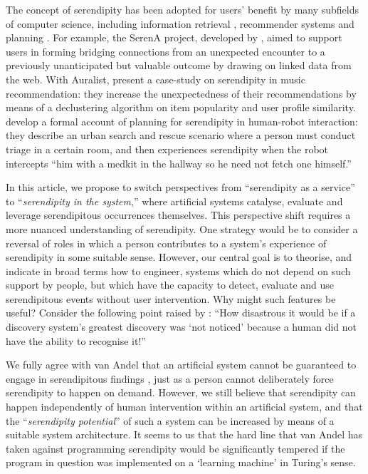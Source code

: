 The concept of serendipity has been adopted for users' benefit by many subfields of computer science, including information retrieval \cite{Toms2000, Andre:2009:XSP:1518701.1519009}, recommender systems \cite{kotkov2016survey} and planning \cite{muscettola1997board, chakraborti2015planning}. For example, the {\sf SerenA} project, developed by \citet{maxwell2012designing}, aimed to support users in forming bridging connections from an unexpected encounter to a previously unanticipated but valuable outcome by drawing on linked data from the web. With {\sf Auralist}, \citet{Zhang2011} present a case-study on serendipity in music recommendation: they increase the unexpectedness of their recommendations by means of a declustering algorithm on item popularity and user profile similarity. \citet{chakraborti2015planning} develop a formal account of planning for serendipity in human-robot interaction: they describe an urban search and rescue scenario where a person must conduct triage in a certain room, and then experiences serendipity when the robot intercepts ``him with a medkit in the hallway so he need not fetch one himself.''

In this article, we propose to switch perspectives from ``serendipity as a service'' to ``\emph{serendipity in the system},'' where artificial systems catalyse, evaluate and leverage serendipitous occurrences themselves. This perspective shift requires a more nuanced understanding of serendipity.  One strategy would be to consider a reversal of roles in which a person contributes to a system's experience of serendipity in some suitable sense.  However, our central goal is to theorise, and indicate in broad terms how to engineer, systems which do not depend on such support by people, but which have the capacity to detect, evaluate and use serendipitous events without user intervention.  Why might such features be useful?  Consider the following point raised by \citet{delamaza1994generate}: ``How disastrous it would be if a discovery system's greatest discovery was `not noticed' because a human did not have the ability to recognise it!''

We fully agree with van Andel that an artificial system cannot be guaranteed to engage in serendipitous findings \cite{van1994anatomy}, just as a person cannot deliberately force serendipity to happen on demand.  However, we still believe that serendipity can happen independently of human intervention within an artificial system, and that the ``\emph{serendipity potential}'' of such a system can be increased by means of a suitable system architecture.  It seems to us that the hard line that van Andel has taken against programming serendipity would be significantly tempered if the program in question was implemented on a `learning machine' in Turing's sense.

